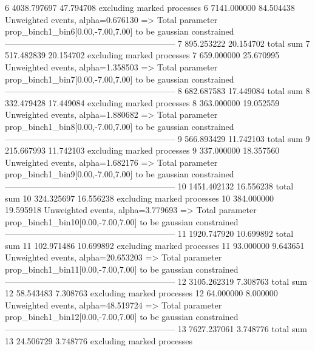 6          4038.797697     47.794708       excluding marked processes    
6          7141.000000     84.504438       Unweighted events, alpha=0.676130
  => Total parameter prop_binch1_bin6[0.00,-7.00,7.00] to be gaussian constrained
------------------------------------------------------------
7          895.253222      20.154702       total sum                     
7          517.482839      20.154702       excluding marked processes    
7          659.000000      25.670995       Unweighted events, alpha=1.358503
  => Total parameter prop_binch1_bin7[0.00,-7.00,7.00] to be gaussian constrained
------------------------------------------------------------
8          682.687583      17.449084       total sum                     
8          332.479428      17.449084       excluding marked processes    
8          363.000000      19.052559       Unweighted events, alpha=1.880682
  => Total parameter prop_binch1_bin8[0.00,-7.00,7.00] to be gaussian constrained
------------------------------------------------------------
9          566.893429      11.742103       total sum                     
9          215.667993      11.742103       excluding marked processes    
9          337.000000      18.357560       Unweighted events, alpha=1.682176
  => Total parameter prop_binch1_bin9[0.00,-7.00,7.00] to be gaussian constrained
------------------------------------------------------------
10         1451.402132     16.556238       total sum                     
10         324.325697      16.556238       excluding marked processes    
10         384.000000      19.595918       Unweighted events, alpha=3.779693
  => Total parameter prop_binch1_bin10[0.00,-7.00,7.00] to be gaussian constrained
------------------------------------------------------------
11         1920.747920     10.699892       total sum                     
11         102.971486      10.699892       excluding marked processes    
11         93.000000       9.643651        Unweighted events, alpha=20.653203
  => Total parameter prop_binch1_bin11[0.00,-7.00,7.00] to be gaussian constrained
------------------------------------------------------------
12         3105.262319     7.308763        total sum                     
12         58.543483       7.308763        excluding marked processes    
12         64.000000       8.000000        Unweighted events, alpha=48.519724
  => Total parameter prop_binch1_bin12[0.00,-7.00,7.00] to be gaussian constrained
------------------------------------------------------------
13         7627.237061     3.748776        total sum                     
13         24.506729       3.748776        excluding marked processes    
